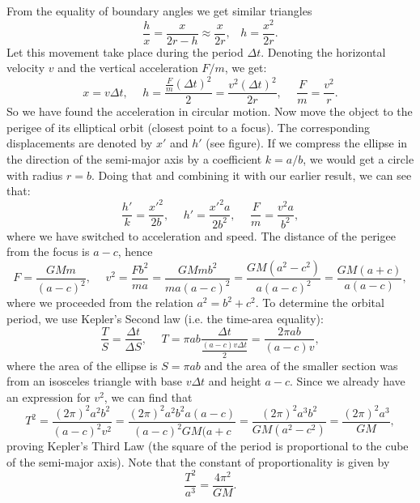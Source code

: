 \documentclass[11pt]{article}
\begin{document}
From the equality of boundary angles we get similar triangles
\[\frac{h}{x} = \frac{x}{2r - h}\approx \frac{x}{2r},\hspace{10pt} h = \frac{x^2}{2r}.\]
Let this movement take place during the period $\Delta t$. Denoting the horizontal velocity $v$ and the vertical acceleration $F/m$, we get:
\[x = v\Delta t, \hspace{15pt} h = \frac{\frac{F}{m}(\Delta t)^2}{2} = \frac{v^2(\Delta t)^2}{2r}, \hspace{15pt} \frac{F}{m} = \frac{v^2}{r}.\]
So we have found the acceleration in circular motion. Now move the object to the perigee of its elliptical orbit (closest point to a focus). The corresponding displacements are denoted by $x'$ and $h'$ (see figure). If we compress the ellipse in the direction of the semi-major axis by a coefficient $k = a / b$, we would get a circle with radius $r = b$. Doing that and combining it with our earlier result, we can see that:
\[\frac{h'}{k} = \frac{x'^2}{2b}, \hspace{15pt} h' = \frac{x'^2 a}{2b^2}, \hspace{15pt} \frac{F}{m} = \frac{v^2 a}{b^2},\]
where we have switched to acceleration and speed. The distance of the perigee from the focus is $a - c$, hence
\[F = \frac{GMm}{(a-c)^2}, \hspace{15pt} v^2 = \frac{Fb^2}{ma} = \frac{GMmb^2}{ma(a-c)^2} = \frac{GM(a^2 - c^2)}{a(a - c)^2} = \frac{GM (a + c)}{a(a - c)},\]
where we proceeded from the relation $a^2 = b^2 + c^2$. To determine the orbital period, we use Kepler's Second law (i.e. the time-area equality):
\[\frac{T}{S} = \frac{\Delta t}{\Delta S}, \hspace{15pt} T = \pi ab\frac{\Delta t}{\frac{(a - c)v\Delta t}{2}} = \frac{2\pi ab}{(a - c)v},\]
where the area of the ellipse is $S = \pi ab$ and the area of the smaller section was from an isosceles triangle with base $v\Delta t$ and height $a-c$. Since we already have an expression for $v^2$, we can find that
\[T^2 = \frac{(2\pi)^2a^2b^2}{(a - c)^2v^2} = \frac{(2\pi)^2a^2b^2a(a-c)}{(a-c)^2GM(a + c} =  \frac{(2\pi)^2a^3b^2}{GM(a^2-c^2)}= \frac{(2\pi)^2a^3}{GM},\]
proving Kepler's Third Law (the square of the period is proportional to the cube of the semi-major axis). Note that the constant of proportionality is given by
$$\dfrac{T^2}{a^3}=\dfrac{4\pi^2}{GM}.$$

\newpage
\vspace{-5mm}
\end{document}
